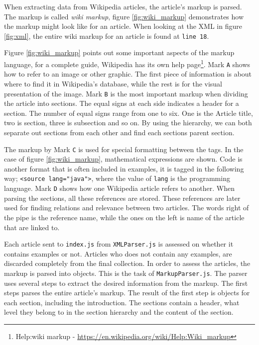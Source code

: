 When extracting data from Wikipedia articles, the article's markup is parsed. The markup is called \textit{wiki markup}, figure \ref{fig:wiki_markup} demonstrates how the markup might look like for an article. When looking at the XML in figure \ref{fig:xml}, the entire wiki markup for an article is found at \texttt{line 18}.

Figure \ref{fig:wiki_markup} points out some important aspects of the markup language, for a complete guide, Wikipedia has its own help page\footnote{Help:wiki markup - \url{https://en.wikipedia.org/wiki/Help:Wiki_markup}}. Mark \texttt{A} shows how to refer to an image or other graphic. The first piece of information is about where to find it in Wikipedia's database, while the rest is for the visual presentation of the image. Mark \texttt{B} is the most important markup when dividing the article into sections. The equal signs at each side indicates a header for a section. The number of equal signs range from one to six. One is the Article title, two is section, three is subsection and so on. By using the hierarchy, we can both separate out sections from each other and find each sections parent section.

The markup by Mark \texttt{C} is used for special formatting between the tags. In the case of figure \ref{fig:wiki_markup}, mathematical expressions are shown. Code is another format that is often included in examples, it is tagged in the following way; \texttt{<source lang="java">}, where the value of \texttt{lang} is the programming language. Mark \texttt{D} shows how one Wikipedia article refers to another. When parsing the sections, all these references are stored. These references are later used for finding relations and relevance between two articles. The words right of the pipe is the reference name, while the ones on the left is name of the article that are linked to. 


Each article sent to \texttt{index.js} from \texttt{XMLParser.js} is assessed on whether it contains examples or not. Articles who does not contain any examples, are discarded completely from the final collection. In order to assess the articles, the markup is parsed into objects. This is the task of \texttt{MarkupParser.js}. The parser uses several steps to extract the desired information from the markup. The first steps parses the entire article's markup. The result of the first step is objects for each section, including the introduction. The sections contain a header, what level they belong to in the section hierarchy and the content of the section. 

